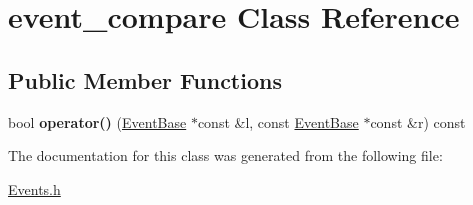\hypertarget{classevent__compare}{\section{event\-\_\-compare Class Reference}
\label{classevent__compare}
}
\subsection*{Public Member Functions}
\begin{DoxyCompactItemize}
\item 
\hypertarget{classevent__compare_aa518df542cf3237d52108959a623fddf}{bool {\bfseries operator()} (\hyperlink{class_event_base}{Event\-Base} $\ast$const \&l, const \hyperlink{class_event_base}{Event\-Base} $\ast$const \&r) const }\label{classevent__compare_aa518df542cf3237d52108959a623fddf}

\end{DoxyCompactItemize}


The documentation for this class was generated from the following file\-:\begin{DoxyCompactItemize}
\item 
\hyperlink{_events_8h}{Events.\-h}\end{DoxyCompactItemize}
